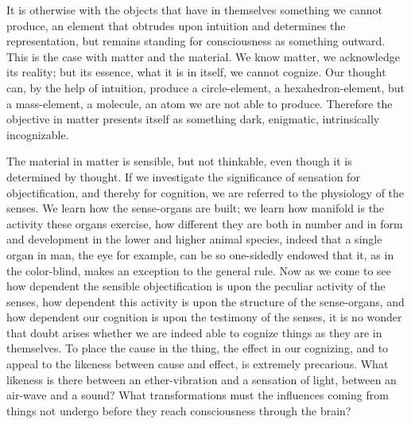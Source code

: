 \documentclass[12pt]{book}
\begin{document}
It is otherwise with the objects that have in themselves something we cannot
produce, an element that obtrudes upon intuition and determines the
representation, but remains standing for consciousness as something outward.
This is the case with matter and the material. We know matter, we acknowledge
its reality; but its essence, what it is in itself, we cannot cognize. Our
thought can, by the help of intuition, produce a circle-element, a
hexahedron-element, but a mass-element, a molecule, an atom we are not able to
produce. Therefore the objective in matter presents itself as something dark,
enigmatic, intrinsically incognizable.

The material in matter is sensible, but not thinkable, even though it is
determined by thought. If we investigate the significance of sensation for
objectification, and thereby for cognition, we are referred to the physiology
of the senses. We learn how the sense-organs are built; we learn how
manifold is the activity these organs exercise, how different they are both in
number and in form and development in the lower and higher animal species,
indeed that a single organ in man, the eye for example, can be so one-sidedly
endowed that it, as in the color-blind, makes an exception to the general rule.
Now as we come to see how dependent the sensible objectification is upon the
peculiar activity of the senses, how dependent this activity is upon the
structure of the sense-organs, and how dependent our cognition is upon the
testimony of the senses, it is no wonder that doubt arises whether we are
indeed able to cognize things as they are in themselves. To place the cause in
the thing, the effect in our cognizing, and to appeal to the likeness between
cause and effect, is extremely precarious. What likeness is there between an
ether-vibration and a sensation of light, between an air-wave and a sound?
What transformations must the influences coming from things not undergo before
they reach consciousness through the brain?
\end{document}
